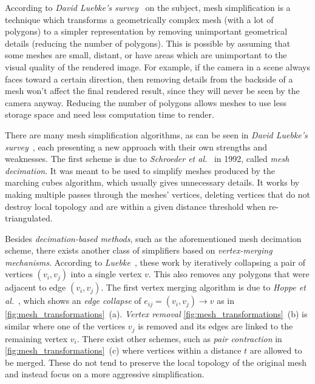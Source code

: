 According to \emph{David Luebke's survey}~\cite{luebke2001developer} on the subject, mesh simplification is a technique which transforms a geometrically complex mesh (with a lot of polygons) to a simpler representation by removing unimportant geometrical details (reducing the number of polygons). This is possible by assuming that some meshes are small, distant, or have areas which are unimportant to the visual quality of the rendered image. For example, if the camera in a scene always faces toward a certain direction, then removing details from the backside of a mesh won't affect the final rendered result, since they will never be seen by the camera anyway. Reducing the number of polygons allows meshes to use less storage space and need less computation time to render.

There are many mesh simplification algorithms, as can be seen in \emph{David Luebke's survey}~\cite{luebke2001developer}, each presenting a new approach with their own strengths and weaknesses. The first scheme is due to \emph{Schroeder et al.}~\cite{schroeder1992decimation} in 1992, called \emph{mesh decimation}. It was meant to be used to simplify meshes produced by the marching cubes algorithm, which usually gives unnecessary details. It works by making multiple passes through the meshes' vertices, deleting vertices that do not destroy local topology and are within a given distance threshold when re-triangulated.

Besides \emph{decimation-based methods}, such as the aforementioned mesh decimation scheme, there exists another class of simplifiers based on \emph{vertex-merging mechanisms}. According to \emph{Luebke}~\cite{luebke2001developer}, these work by iteratively collapsing a pair of vertices \((v_i, v_j)\) into a single vertex \(v\). This also removes any polygons that were adjacent to edge \((v_i, v_j)\). The first vertex merging algorithm is due to \emph{Hoppe et al.}~\cite{hoppe1993mesh}, which shows an \emph{edge collapse} of \(e_{ij} = (v_i, v_j) \rightarrow v\) as in \cref{fig:mesh_transformations}~(a).  \emph{Vertex removal} \cref{fig:mesh_transformations}~(b) is similar where one of the vertices \(v_j\) is removed and its edges are linked to the remaining vertex \(v_i\). There exist other schemes, such as \emph{pair contraction} in \cref{fig:mesh_transformations}~(c) where vertices within a distance \(t\) are allowed to be merged. These do not tend to preserve the local topology of the original mesh and instead focus on a more aggressive simplification.


